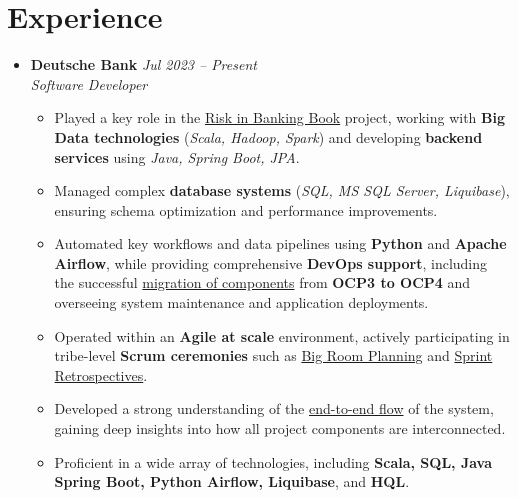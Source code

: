 \documentclass[a4paper,10pt]{article} %
\begin{document}
\section*{Experience}
\begin{itemize}[leftmargin=0.3in, itemsep=0.7pt, topsep=2pt] %
    \item
    \textbf{Deutsche Bank} \hfill \textit{Jul 2023 – Present} \\
    \textit{Software Developer}
    \begin{itemize}[leftmargin=*]
        \item Played a key role in the \underline{Risk in Banking Book} project, working with \textbf{Big Data technologies} (\textit{Scala, Hadoop, Spark}) and developing \textbf{backend services} using \textit{Java, Spring Boot, JPA}.
    \item Managed complex \textbf{database systems} (\textit{SQL, MS SQL Server, Liquibase}), ensuring schema optimization and performance improvements.
    \item Automated key workflows and data pipelines using \textbf{Python} and \textbf{Apache Airflow}, while providing comprehensive \textbf{DevOps support}, including the successful \underline{migration of components} from \textbf{OCP3 to OCP4} and overseeing system maintenance and application deployments.
    \item Operated within an \textbf{Agile at scale} environment, actively participating in tribe-level \textbf{Scrum ceremonies} such as \underline{Big Room Planning} and \underline{Sprint Retrospectives}.
    \item Developed a strong understanding of the \underline{end-to-end flow} of the system, gaining deep insights into how all project components are interconnected.
    \item Proficient in a wide array of technologies, including \textbf{Scala, SQL, Java Spring Boot, Python Airflow, Liquibase}, and \textbf{HQL}.

    \end{itemize}


\end{itemize}
\end{document}

